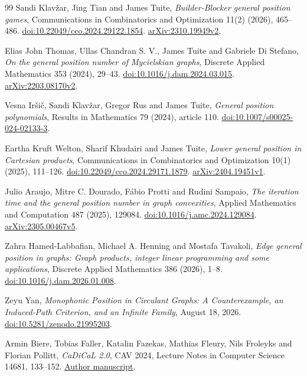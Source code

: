\documentclass[11pt]{article}
\theoremstyle{remark}
\begin{document}
\begin{thebibliography}{99}
Sandi Klav\v{z}ar, Jing Tian and James Tuite, \emph{Builder-Blocker
general position games}, Communications in Combinatorics and Optimization
11(2) (2026), 465--486.\newline
\href{https://doi.org/10.22049/cco.2024.29122.1854}{doi:10.22049/cco.2024.29122.1854}.
\href{https://arxiv.org/abs/2310.19949v2}{arXiv:2310.19949v2}.

Elias John Thomas, Ullas Chandran S. V., James Tuite and Gabriele Di
Stefano, \emph{On the general position number of Mycielskian graphs},
Discrete Applied Mathematics 353 (2024), 29--43.
\href{https://doi.org/10.1016/j.dam.2024.03.015}{doi:10.1016/j.dam.2024.03.015}.
\href{https://arxiv.org/abs/2203.08170v2}{arXiv:2203.08170v2}.

Vesna Ir\v{s}i\v{c}, Sandi Klav\v{z}ar, Gregor Rus and James Tuite,
\emph{General position polynomials}, Results in Mathematics 79 (2024),
article 110.
\href{https://doi.org/10.1007/s00025-024-02133-3}{doi:10.1007/s00025-024-02133-3}.

Eartha Kruft Welton, Sharif Khudairi and James Tuite, \emph{Lower general
position in Cartesian products}, Communications in Combinatorics and
Optimization 10(1) (2025), 111--126.
\href{https://doi.org/10.22049/cco.2024.29171.1879}{doi:10.22049/cco.2024.29171.1879}.
\href{https://arxiv.org/abs/2404.19451v1}{arXiv:2404.19451v1}.

Julio Araujo, Mitre C. Dourado, F\'abio Protti and Rudini Sampaio,
\emph{The iteration time and the general position number in graph
convexities}, Applied Mathematics and Computation 487 (2025), 129084.
\href{https://doi.org/10.1016/j.amc.2024.129084}{doi:10.1016/j.amc.2024.129084}.
\href{https://arxiv.org/abs/2305.00467v5}{arXiv:2305.00467v5}.

Zahra Hamed-Labbafian, Michael A. Henning and Mostafa Tavakoli,
\emph{Edge general position in graphs: Graph products, integer linear
programming and some applications}, Discrete Applied Mathematics 386
(2026), 1--8.
\href{https://doi.org/10.1016/j.dam.2026.01.008}{doi:10.1016/j.dam.2026.01.008}.

Zeyu Yan, \emph{Monophonic Position in Circulant Graphs: A
Counterexample, an Induced-Path Criterion, and an Infinite Family},
August 18, 2026.
\href{https://doi.org/10.5281/zenodo.21995203}{doi:10.5281/zenodo.21995203}.

Armin Biere, Tobias Faller, Katalin Fazekas, Mathias Fleury,
Nils Froleyks and Florian Pollitt, \emph{CaDiCaL 2.0}, CAV 2024,
Lecture Notes in Computer Science 14681, 133--152.
\href{https://cca.informatik.uni-freiburg.de/papers/BiereFallerFazekasFleuryFroleyksPollitt-CAV24.pdf}{Author manuscript}.


\end{thebibliography}
\end{document}
